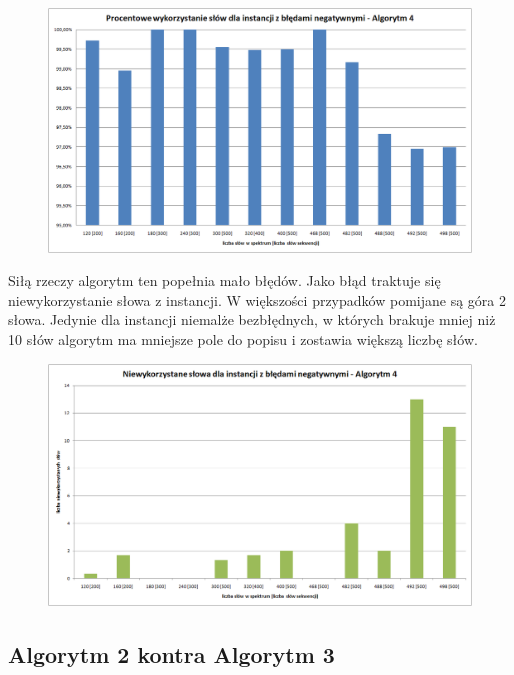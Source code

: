 \documentclass[a4paper,10pt]{article}
\begin{document}
\begin{figure}[h]
  \footnotesize\centering
  \includegraphics[width=\textwidth,keepaspectratio]{percentageUsedWords_negative.png}
\end{figure}

Siłą rzeczy algorytm ten popełnia mało błędów. Jako błąd traktuje się niewykorzystanie słowa z instancji. W większości przypadków pomijane są góra 2 słowa. Jedynie dla instancji niemalże bezbłędnych, w których brakuje mniej niż 10 słów algorytm ma mniejsze pole do popisu i zostawia większą liczbę słów.

\begin{figure}[h]
  \footnotesize\centering
  \includegraphics[width=\textwidth,keepaspectratio]{unusedWords_negative.png}
\end{figure}

\subsection{Algorytm 2 kontra Algorytm 3}
\end{document}
